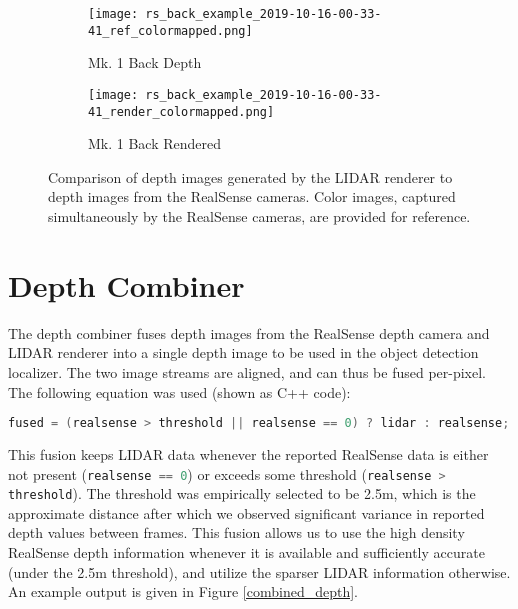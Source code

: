 \begin{figure}
\begin{subfigure}{0.32\textwidth}
		\texttt{[image: rs\_back\_example\_2019-10-16-00-33-41\_ref\_colormapped.png]}
		\caption{Mk. 1 Back Depth}
		\label{lidar_back_ref}		
	\end{subfigure}
	\hfill
	\begin{subfigure}{0.32\textwidth}
		\texttt{[image: rs\_back\_example\_2019-10-16-00-33-41\_render\_colormapped.png]}
		\caption{Mk. 1 Back Rendered}
		\label{lidar_back_render}
	\end{subfigure}		
	\caption[LIDAR renderer depth image comparison]{Comparison of depth images generated by the LIDAR renderer to depth images from the RealSense cameras. Color images, captured simultaneously by the RealSense cameras, are provided for reference.}
	\label{lidar_renderer_images}
\end{figure}

\section{Depth Combiner}

The depth combiner fuses depth images from the RealSense depth camera and LIDAR renderer into a single depth image to be used in the object detection localizer. The two image streams are aligned, and can thus be fused per-pixel. The following equation was used (shown as C++ code):

\begin{lstlisting}[language=c++]
fused = (realsense > threshold || realsense == 0) ? lidar : realsense;
\end{lstlisting}

This fusion keeps LIDAR data whenever the reported RealSense data is either not present (\lstinline[language=c++]{realsense == 0}) or exceeds some threshold (\lstinline[language=c++]{realsense > threshold}). The threshold was empirically selected to be 2.5m, which is the approximate distance after which we observed significant variance in reported depth values between frames. This fusion allows us to use the high density RealSense depth information whenever it is available and sufficiently accurate (under the 2.5m threshold), and utilize the sparser LIDAR information otherwise. An example output is given in Figure \ref{combined_depth}.

